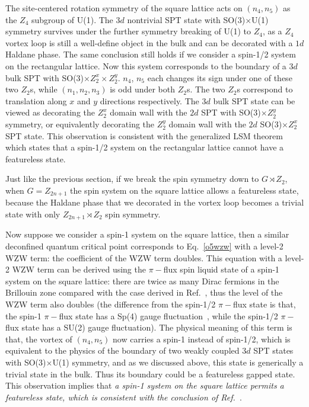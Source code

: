 \documentclass[aps,prb,twocolumn,superscriptaddress,showpacs]{revtex4}
\begin{document}
The site-centered rotation symmetry of the square lattice acts on
$(n_4, n_5)$ as the $Z_4$ subgroup of U(1). The $3d$ nontrivial
SPT state with SO(3)$\times$U(1) symmetry survives under the
further symmetry breaking of U(1) to $Z_4$, as a $Z_4$ vortex loop
is still a well-define object in the bulk and can be decorated
with a $1d$ Haldane phase. The same conclusion still holds if we
consider a spin-1/2 system on the rectangular lattice. Now this
system corresponds to the boundary of a $3d$ bulk SPT with SO(3)$
\times Z^x_2 \times Z^y_2$. $n_4$, $n_5$ each changes its sign
under one of these two $Z_2$s, while $(n_1, n_2, n_3)$ is odd
under both $Z_2$s. The two $Z_2$s correspond to translation along
$x$ and $y$ directions respectively. The $3d$ bulk SPT state can
be viewed as decorating the $Z^x_2$ domain wall with the $2d$ SPT
with SO(3)$\times Z_2^y$ symmetry, or equivalently decorating the
$Z^y_2$ domain wall with the $2d$ SO(3)$\times Z_2^x$ SPT state.
This observation is consistent with the generalized LSM theorem
which states that a spin-1/2 system on the rectangular lattice
cannot have a featureless state.

Just like the previous section, if we break the spin symmetry down
to $G \rtimes Z_2$, when $G = Z_{2n+1}$ the spin system on the
square lattice allows a featureless state, because the Haldane
phase that we decorated in the vortex loop becomes a trivial state
with only $Z_{2n+1} \rtimes Z_2$ spin symmetry.

Now suppose we consider a spin-1 system on the square lattice,
then a similar deconfined quantum critical point corresponds to
Eq.~\ref{o5wzw} with a level-2 WZW term: the coefficient of the
WZW term doubles. This equation with a level-2 WZW term can be
derived using the $\pi-$flux spin liquid state of a spin-1 system
on the square lattice: there are twice as many Dirac fermions in
the Brillouin zone compared with the case derived in
Ref.~, thus the level of the WZW term
also doubles (the difference from the spin-1/2 $\pi-$flux state is
that, the spin-1 $\pi-$flux state has a Sp(4) gauge
fluctuation~\cite{xuspin1}, while the spin-1/2 $\pi-$flux state
has a SU(2) gauge fluctuation). The physical meaning of this term
is that, the vortex of $(n_4, n_5)$ now carries a spin-1 instead
of spin-1/2, which is equivalent to the physics of the boundary of
two weakly coupled $3d$ SPT states with SO(3)$\times$U(1)
symmetry, and as we discussed above, this state is generically a
trivial state in the bulk. Thus its boundary could be a
featureless gapped state. This observation implies that {\it a
spin-1 system on the square lattice permits a featureless state,
which is consistent with the conclusion of
Ref.~}.
\end{document}
